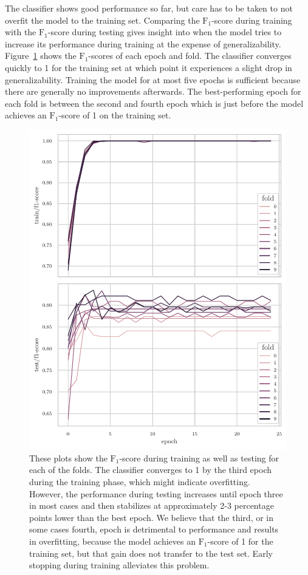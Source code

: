 \documentclass[draft,final]{vutinfth} %
\begin{document}
The classifier shows good performance so far, but care has to be taken
to not overfit the model to the training set. Comparing the
$\mathrm{F}_1$-score during training with the $\mathrm{F}_1$-score
during testing gives insight into when the model tries to increase its
performance during training at the expense of
generalizability. Figure~\ref{fig:classifier-hyp-folds} shows the
$\mathrm{F}_1$-scores of each epoch and fold. The classifier converges
quickly to \num{1} for the training set at which point it experiences
a slight drop in generalizability. Training the model for at most five
epochs is sufficient because there are generally no improvements
afterwards. The best-performing epoch for each fold is between the
second and fourth epoch which is just before the model achieves an
$\mathrm{F}_1$-score of \num{1} on the training set.

\begin{figure}
  \centering
  \includegraphics[width=.9\textwidth]{graphics/classifier-hyp-folds-f1.pdf}
  \caption[$\mathrm{F}_1$-score of stratified $10$-fold cross
  validation.]{These plots show the $\mathrm{F}_1$-score during
    training as well as testing for each of the folds. The classifier
    converges to \num{1} by the third epoch during the training phase,
    which might indicate overfitting. However, the performance during
    testing increases until epoch three in most cases and then
    stabilizes at approximately 2-3 percentage points lower than the
    best epoch. We believe that the third, or in some cases fourth,
    epoch is detrimental to performance and results in overfitting,
    because the model achieves an $\mathrm{F}_1$-score of \num{1} for
    the training set, but that gain does not transfer to the test
    set. Early stopping during training alleviates this problem.}
  \label{fig:classifier-hyp-folds}
\end{figure}
\end{document}

